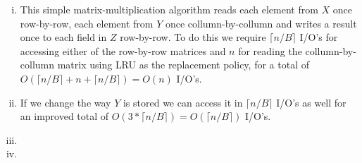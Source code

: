 \begin{enumerate}[(i)]
	\item
This simple matrix-multiplication algorithm reads each element from $X$ once row-by-row, each element from $Y$ once collumn-by-collumn and writes a result once to each field in $Z$ row-by-row. To do this we require $\lceil n/B \rceil$ I/O's for accessing either of the row-by-row matrices and $n$ for reading the collumn-by-collumn matrix using \textsc{LRU} as the replacement policy, for a total of $O(\lceil n/B \rceil + n + \lceil n/B \rceil) = O(n)$ I/O's.
	\item
If we change the way $Y$ is stored we can access it in $\lceil n/B \rceil$ I/O's as well for an improved total of $O(3 * \lceil n/B \rceil) = O(\lceil n/B \rceil)$ I/O's.
	\item
	\item
\end{enumerate}
